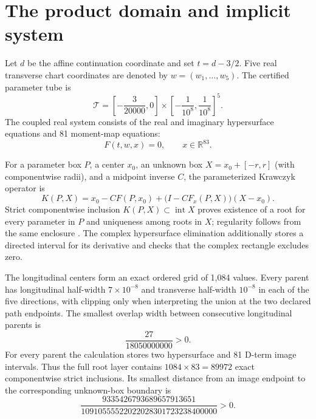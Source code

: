 \documentclass[11pt]{article}
\newcommand{\TT}{\mathcal{T}}
\begin{document}
\section{The product domain and implicit system}

Let $d$ be the affine continuation coordinate and set $t=d-3/2$.  Five real
transverse chart coordinates are denoted by $w=(w_1,\ldots,w_5)$.  The
certified parameter tube is
\begin{equation}\label{eq:tube}
 \TT=\left[-\frac{3}{20000},0\right]
       \times\left[-\frac{1}{10^8},\frac{1}{10^8}\right]^5.
\end{equation}
The coupled real system consists of the real and imaginary hypersurface
equations and 81 moment-map equations:
\begin{equation}\label{eq:F}
 F(t,w,x)=0,\qquad x\in\mathbb R^{83}.
\end{equation}

For a parameter box $P$, a center $x_0$, an unknown box $X=x_0+[-r,r]$
(with componentwise radii), and a midpoint inverse $C$, the parameterized
Krawczyk operator is
\begin{equation}\label{eq:krawczyk}
 K(P,X)=x_0-CF(P,x_0)+\bigl(I-CF_x(P,X)\bigr)(X-x_0).
\end{equation}
Strict componentwise inclusion
$K(P,X)\subset\operatorname{int}X$ proves existence of a root for every
parameter in $P$ and uniqueness among roots in $X$; regularity follows from
the same enclosure \cite{Moore2009,Breiding2023}.  The complex hypersurface
elimination additionally stores a directed interval for its derivative and
checks that the complex rectangle excludes zero.

The longitudinal centers form an exact ordered grid of 1,084 values.  Every
parent has longitudinal half-width $7\times10^{-8}$ and transverse half-width
$10^{-8}$ in each of the five directions, with clipping only when interpreting
the union at the two declared path endpoints.  The smallest overlap width
between consecutive longitudinal parents is
\begin{equation}\label{eq:overlap}
 \frac{27}{18050000000}>0.
\end{equation}
For every parent the calculation stores two hypersurface and 81 D-term image
intervals.  Thus the full root layer contains $1084\times83=89972$ exact
componentwise strict inclusions.  Its smallest distance from an image endpoint
to the corresponding unknown-box boundary is
\begin{equation}\label{eq:rootmargin}
 \frac{9335426793689657913651}
 {10910555522022028301723238400000}>0.
\end{equation}
\end{document}
